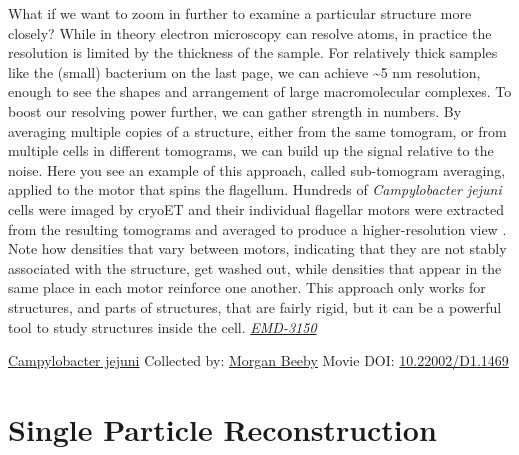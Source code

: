 \documentclass[]{tufte-book}
\begin{document}
What if we want to zoom in further to examine a particular structure more closely? While in theory electron microscopy can resolve atoms, in practice the resolution is limited by the thickness of the sample. For relatively thick samples like the (small) bacterium on the last page, we can achieve \textasciitilde{}5 nm resolution, enough to see the shapes and arrangement of large macromolecular complexes. To boost our resolving power further, we can gather strength in numbers. By averaging multiple copies of a structure, either from the same tomogram, or from multiple cells in different tomograms, we can build up the signal relative to the noise. Here you see an example of this approach, called sub-tomogram averaging, applied to the motor that spins the flagellum. Hundreds of \emph{Campylobacter jejuni} cells were imaged by cryoET and their individual flagellar motors were extracted from the resulting tomograms and averaged to produce a higher-resolution view \citep{beeby2016}. Note how densities that vary between motors, indicating that they are not stably associated with the structure, get washed out, while densities that appear in the same place in each motor reinforce one another. This approach only works for structures, and parts of structures, that are fairly rigid, but it can be a powerful tool to study structures inside the cell. \href{https://www.ebi.ac.uk/pdbe/entry/emdb/emd-3150}{\emph{EMD-3150}}



\hypertarget{htmlwidget-4444615f17a76f1064da}{}

\label{fig:1-7}\protect\hyperlink{tree}{Campylobacter jejuni} Collected by: \protect\hyperlink{morgan_beeby}{Morgan Beeby} Movie DOI: \href{https://doi.org/10.22002/D1.1469}{10.22002/D1.1469}

\hypertarget{single-particle-reconstruction}{%
\section{Single Particle Reconstruction}\label{single-particle-reconstruction}}
\end{document}
